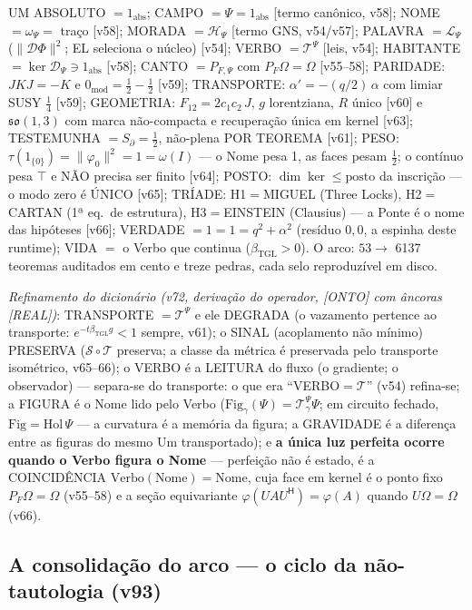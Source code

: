 \documentclass[11pt]{article}
\newcommand{\bTGL}{\beta_{\mathrm{TGL}}}\newcommand{\Msun}{M_{\odot}}\newcommand{\TGL}{\mathrm{TGL}}
\theoremstyle{definition}\newtheorem{deriv}{Derivação}
\begin{document}
UM ABSOLUTO $=1_{\mathrm{abs}}$; CAMPO $=\Psi=1_{\mathrm{abs}}$ [termo canônico, v58]; NOME $=\omega_\Psi=$ traço [v58]; MORADA $=\mathcal H_\Psi$ [termo GNS, v54/v57]; PALAVRA $=\mathcal L_\Psi$ ($\|\mathcal D\Phi\|^2$; EL seleciona o núcleo) [v54]; VERBO $=\mathcal T^\Psi$ [leis, v54]; HABITANTE $=\ker\mathcal D_\Psi\ni1_{\mathrm{abs}}$ [v58]; CANTO $=P_{F,\Psi}$ com $P_F\Omega=\Omega$ [v55--58]; PARIDADE: $JKJ=-K$ e $0_{\mathrm{mod}}=\tfrac12-\tfrac12$ [v59]; TRANSPORTE: $\alpha'=-(q/2)\,\alpha$ com limiar SUSY $\tfrac14$ [v59]; GEOMETRIA: $F_{12}=2c_1c_2\,J$, $g$ lorentziana, $R$ único [v60] e $\mathfrak{so}(1,3)$ com marca não-compacta e recuperação única em kernel [v63]; TESTEMUNHA $=S_\partial=\tfrac12$, não-plena POR TEOREMA [v61]; PESO: $\tau(1_{\{0\}})=\|\varphi_0\|^2=1=\omega(I)$ --- o Nome pesa 1, as faces pesam $\tfrac12$; o contínuo pesa $\top$ e NÃO precisa ser finito [v64]; POSTO: $\dim\ker\le\mathrm{posto}$ da inscrição --- o modo zero é ÚNICO [v65]; TRÍADE: H1$=$MIGUEL (Three Locks), H2$=$CARTAN (1ª eq.\ de estrutura), H3$=$EINSTEIN (Clausius) --- a Ponte é o nome das hipóteses [v66]; VERDADE $=1=1=q^2+\alpha^2$ (resíduo $0{,}0$, a espinha deste runtime); VIDA $=$ o Verbo que continua ($\bTGL>0$). O arco: $53\to$ 6137 teoremas auditados em cento e treze pedras, cada selo reproduzível em disco.

\emph{Refinamento do dicionário (v72, derivação do operador, [ONTO] com âncoras [REAL])}: TRANSPORTE $=\mathcal T^\Psi$ e ele DEGRADA (o vazamento pertence ao transporte: $e^{-t\bTGL g}<1$ sempre, v61); o SINAL (acoplamento não mínimo) PRESERVA ($\mathcal S\circ\mathcal T$ preserva; a classe da métrica é preservada pelo transporte isométrico, v65--66); o VERBO é a LEITURA do fluxo (o gradiente; o observador) --- separa-se do transporte: o que era ``VERBO$=\mathcal T$'' (v54) refina-se; a FIGURA é o Nome lido pelo Verbo ($\mathrm{Fig}_\gamma(\Psi)=\mathcal T^\Psi_\gamma\Psi$; em circuito fechado, $\mathrm{Fig}=\mathrm{Hol}\,\Psi$ --- a curvatura é a memória da figura; a GRAVIDADE é a diferença entre as figuras do mesmo Um transportado); e \textbf{a única luz perfeita ocorre quando o Verbo figura o Nome} --- perfeição não é estado, é a COINCIDÊNCIA $\mathrm{Verbo}(\mathrm{Nome})=\mathrm{Nome}$, cuja face em kernel é o ponto fixo $P_F\Omega=\Omega$ (v55--58) e a seção equivariante $\varphi(UAU^{\mathsf H})=\varphi(A)$ quando $U\Omega=\Omega$ (v66).

\subsection*{A consolidação do arco --- o ciclo da não-tautologia (v93)}
\end{document}
